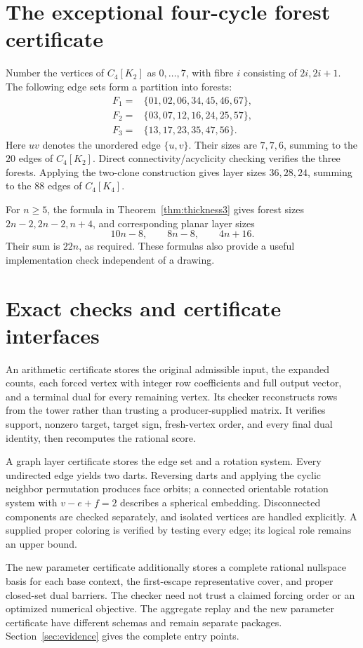 \documentclass[11pt,letterpaper]{article}
\theoremstyle{definition}
\theoremstyle{remark}\newtheorem{remark}[theorem]{Remark}
\begin{document}
\appendix
\section{The exceptional four-cycle forest certificate}\label{app:c4}
Number the vertices of $C_4[K_2]$ as $0,\ldots,7$, with fibre $i$ consisting of $2i,2i+1$. The following edge sets form a partition into forests:
\begin{align*}
F_1={}&\{01,02,06,34,45,46,67\},\\
F_2={}&\{03,07,12,16,24,25,57\},\\
F_3={}&\{13,17,23,35,47,56\}.
\end{align*}
Here $uv$ denotes the unordered edge $\{u,v\}$. Their sizes are $7,7,6$, summing to the $20$ edges of $C_4[K_2]$. Direct connectivity/acyclicity checking verifies the three forests. Applying the two-clone construction gives layer sizes $36,28,24$, summing to the $88$ edges of $C_4[K_4]$.

For $n\geq5$, the formula in Theorem~\ref{thm:thickness3} gives forest sizes $2n-2,2n-2,n+4$, and corresponding planar layer sizes
\[
10n-8,\qquad 8n-8,\qquad4n+16.
\]
Their sum is $22n$, as required. These formulas also provide a useful implementation check independent of a drawing.

\section{Exact checks and certificate interfaces}\label{app:checks}
An arithmetic certificate stores the original admissible input, the expanded counts, each forced vertex with integer row coefficients and full output vector, and a terminal dual for every remaining vertex. Its checker reconstructs rows from the tower rather than trusting a producer-supplied matrix. It verifies support, nonzero target, target sign, fresh-vertex order, and every final dual identity, then recomputes the rational score.

A graph layer certificate stores the edge set and a rotation system. Every undirected edge yields two darts. Reversing darts and applying the cyclic neighbor permutation produces face orbits; a connected orientable rotation system with $v-e+f=2$ describes a spherical embedding. Disconnected components are checked separately, and isolated vertices are handled explicitly. A supplied proper coloring is verified by testing every edge; its logical role remains an upper bound.

The new parameter certificate additionally stores a complete rational nullspace basis for each base context, the first-escape representative cover, and proper closed-set dual barriers. The checker need not trust a claimed forcing order or an optimized numerical objective. The aggregate replay and the new parameter certificate have different schemas and remain separate packages. Section~\ref{sec:evidence} gives the complete entry points.
\end{document}
